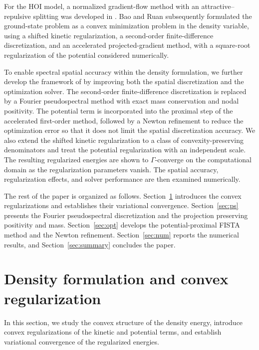 \documentclass[11pt]{article}
\theoremstyle{plain}
\theoremstyle{definition}
\numberwithin{equation}{section}
\begin{document}
For the HOI model, a normalized gradient-flow method with an
attractive--repulsive splitting was developed in \cite{Ruan2018}.
 Bao and Ruan \cite{BaoRuan2019} subsequently formulated the
ground-state problem as a convex minimization problem in the density
variable, using a shifted kinetic regularization, a second-order
finite-difference discretization, and an accelerated projected-gradient
method, with a square-root regularization of the potential considered
numerically.

To enable spectral spatial accuracy within the density formulation, we
further develop the framework of \cite{BaoRuan2019} by improving both
the spatial discretization and the optimization solver. The
second-order finite-difference discretization is replaced by a Fourier
pseudospectral method with exact mass conservation and nodal
positivity. The potential term is incorporated into the proximal step
of the accelerated first-order method, followed by a Newton refinement
to reduce the optimization error so that it does not limit the spatial
discretization accuracy. We also extend the shifted kinetic
regularization to a class of convexity-preserving denominators and
treat the potential regularization with an independent scale. The
resulting regularized energies are shown to $\Gamma$-converge on the
computational domain as the regularization parameters vanish. The
spatial accuracy, regularization effects, and solver performance are
then examined numerically.

The rest of the paper is organized as follows.
Section~\ref{sec:density} introduces the convex regularizations and
establishes their variational convergence.
Section~\ref{sec:ps} presents the Fourier pseudospectral discretization
and the projection preserving positivity and mass.
Section~\ref{sec:opt} develops the potential-proximal FISTA method and
the Newton refinement. Section~\ref{sec:num} reports the numerical
results, and Section~\ref{sec:summary} concludes the paper.
\section{Density formulation and convex regularization}
\label{sec:density}

In this section, we study the convex structure of the density energy,
introduce convex regularizations of the kinetic and potential terms,
and establish variational convergence of the regularized energies.
\end{document}

